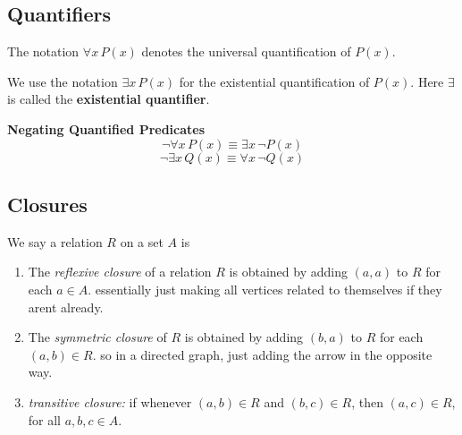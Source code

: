 \documentclass{article}
\begin{document}
\subsection{Quantifiers}
\begin{definition}
    The notation $\forall x \, P(x)$ denotes the universal quantification of $P(x)$.
\end{definition}
\begin{definition}
    We use the notation $\exists x \, P(x)$ for the existential quantification of $P(x)$. 
    Here $\exists$ is called the \textbf{existential quantifier}.
\end{definition}
\begin{theorem}
    \textbf{Negating Quantified Predicates}
    \[
    \neg \forall x \, P(x) \equiv \exists x \, \neg P(x)
    \]
    \[
    \neg \exists x \, Q(x) \equiv \forall x \, \neg Q(x)
    \]
\end{theorem}

\subsection{Closures}
\begin{theorem}
    We say a relation \( R \) on a set \( A \) is
    \begin{enumerate}
        \item The \textit{reflexive closure} of a relation \( R \) is obtained by adding \( (a, a) \) to \( R \) for each \( a \in A \). essentially just making all vertices related to themselves if they arent already.
        \item The \textit{symmetric closure} of \( R \) is obtained by adding \( (b, a) \) to \( R \) for each \( (a, b) \in R \). so in a directed graph, just adding the arrow in the opposite way.
        \item \textit{transitive closure:} if whenever \( (a, b) \in R \) and \( (b, c) \in R \), then \( (a, c) \in R \), for all \( a, b, c \in A \).
    \end{enumerate}
\end{theorem}
\end{document}

